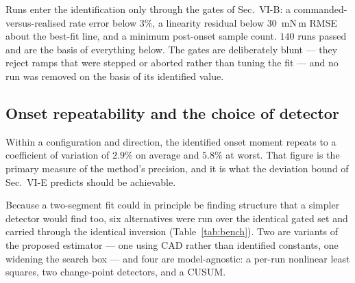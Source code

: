 \documentclass[10pt]{article}
\begin{document}
Runs enter the identification only through the gates of Sec.~VI-B: a
commanded-versus-realised rate error below $3\%$, a linearity residual
below $30$~mN\,m RMSE about the best-fit line, and a minimum
post-onset sample count. $140$ runs passed and are the basis of
everything below. The gates are deliberately blunt --- they reject
ramps that were stepped or aborted rather than tuning the fit --- and
no run was removed on the basis of its identified value.

\subsection*{Onset repeatability and the choice of detector}

Within a configuration and direction, the identified onset moment
repeats to a coefficient of variation of $2.9\%$ on average and
$5.8\%$ at worst. That figure is the primary measure of the method's
precision, and it is what the deviation bound of Sec.~VI-E
predicts should be achievable.

Because a two-segment fit could in principle be finding structure that
a simpler detector would find too, six alternatives were run over the
identical gated set and carried through the identical inversion
(Table~\ref{tab:bench}). Two are variants of the proposed estimator
--- one using CAD rather than identified constants, one widening the
search box --- and four are model-agnostic: a per-run nonlinear least
squares, two change-point detectors, and a CUSUM.
\end{document}
